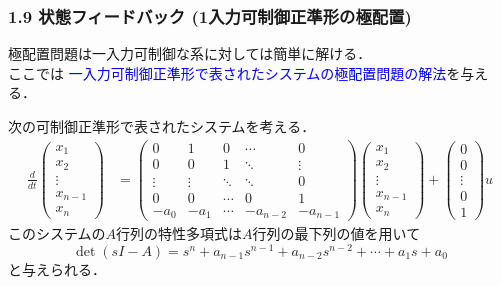 \documentclass[10pt]{beamer}
\begin{document}
\begin{frame}[t]
\frametitle{1.9 状態フィードバック (1入力可制御正準形の極配置)}
極配置問題は一入力可制御な系に対しては簡単に解ける．\\
ここでは
\textcolor{blue}{一入力可制御正準形で表されたシステムの極配置問題の解法}を与える．

次の可制御正準形で表されたシステムを考える．
\begin{align}
 \frac{d}{dt}
  \left(\begin{array}{c}
         x_1 \\
   x_2 \\
   \vdots \\
   x_{n-1} \\
   x_n
  \end{array}\right)
  &=
  \left(\begin{array}{ccccc}
     0      & 1      & 0      & \cdots & 0 \\
   0      & 0      & 1      & \ddots & \vdots \\
   \vdots & \vdots & \ddots & \ddots & 0 \\
   0      & 0      & \cdots & 0      & 1 \\
   -a_0   & -a_1   & \cdots & -a_{n-2} & -a_{n-1}
  \end{array}\right)
  \left(\begin{array}{c}
   x_1 \\
   x_2 \\
   \vdots \\
   x_{n-1} \\
   x_n
  \end{array}\right)
  +
  \left(\begin{array}{c}
         0 \\
   0 \\
   \vdots \\
   0 \\
   1
  \end{array}\right)
  u
\end{align}
このシステムの$A$行列の特性多項式は$A$行列の最下列の値を用いて
\begin{equation}
 \operatorname{det} (sI-{A}) = s^n + a_{n-1} s^{n-1}
  + a_{n-2} s^{n-2} + \cdots + a_1 s + a_0
\end{equation}
と与えられる．

\end{frame}
\end{document}
